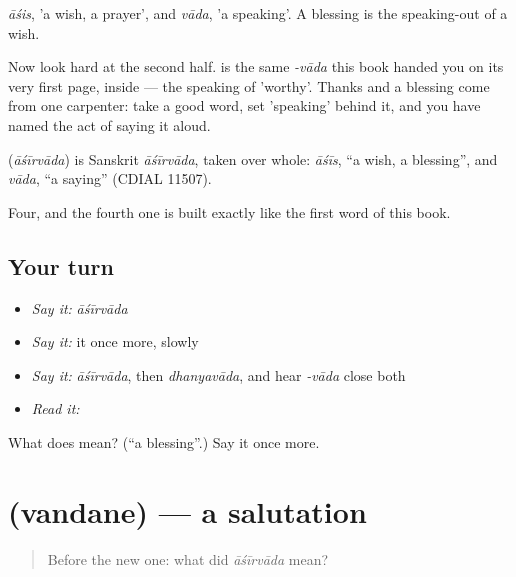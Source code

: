 \emph{āśis}, 'a wish, a prayer', and \emph{vāda}, 'a speaking'. A blessing is the speaking-out of a wish.

Now look hard at the second half.  is the same \emph{-vāda} this book handed you on its very first page, inside  — the speaking of 'worthy'. Thanks and a blessing come from one carpenter: take a good word, set 'speaking' behind it, and you have named the act of saying it aloud.

\begin{cousinweb}
\textbf{} (\emph{āśīrvāda}) is Sanskrit \emph{āśīrvāda}, taken over whole: \emph{āśīs}, \textquotedblleft{}a wish, a blessing\textquotedblright{}, and \emph{vāda}, \textquotedblleft{}a saying\textquotedblright{} (CDIAL 11507).
\end{cousinweb}

\begin{grammarlens}[title={What you've built}]
Four, and the fourth one is built exactly like the first word of this book.
\end{grammarlens}

\subsection*{Your turn}
\begin{itemize}
\raggedright
  \item \emph{Say it:} \emph{āśīrvāda}
  \item \emph{Say it:} it once more, slowly
  \item \emph{Say it:} \emph{āśīrvāda}, then \emph{dhanyavāda}, and hear \emph{-vāda} close both
  \item \emph{Read it:} \textbf{}
\end{itemize}

\begin{tcolorbox}[breakable,colback=teal!4,colframe=teal!35!black,title={Before you move on}]
What does  mean? (\textquotedblleft{}a blessing\textquotedblright{}.) Say it once more.
\end{tcolorbox}
\section[\texorpdfstring{\kn{ವಂದನೆ} (vandane)}{ವಂದನೆ (vandane)}]{ (vandane) — a salutation}

\label{lesson:KA-C51-salutation}



\begin{quote}
Before the new one: what did \emph{āśīrvāda} mean?
\end{quote}

